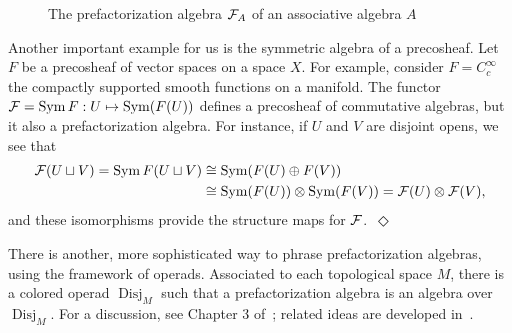 \documentclass[11pt]{amsart}
\def\Disj{\operatorname{Disj}}
\begin{document}
\begin{figure}
\begin{center}
\end{center}
\caption{The prefactorization algebra $\mathcal F_A$ of an associative algebra $A$}
\label{fig:assasfact}
\end{figure}

\begin{eg}\label{ex:SymOfCosheaf}
Another important example for us is the symmetric algebra of a precosheaf. 
Let $F$ be a precosheaf of vector spaces on a space $X$. 
For example, consider $F = C^\infty_c$ the compactly supported smooth functions on a manifold. The functor $\mathcal F  = \operatorname{Sym} F: U \mapsto \operatorname{Sym}(F(U))$ defines a precosheaf of commutative algebras, but it also a prefactorization algebra. For instance, if $U$ and $V$ are disjoint opens, we see that
\begin{align*}
\mathcal F(U \sqcup V) = \operatorname{Sym} F(U \sqcup V) & \cong \operatorname{Sym} (F(U) \oplus F(V)) \\ & \cong \operatorname{Sym}(F(U)) \otimes \operatorname{Sym}(F(V)) = \mathcal F(U) \otimes \mathcal F(V),
\end{align*}
and these isomorphisms provide the structure maps for $\mathcal F$.~\hfill$\Diamond$
\end{eg}

There is another, more sophisticated way to phrase prefactorization algebras, using the framework of operads.
Associated to each topological space $M$, there is a colored operad $\Disj_M$ such that a prefactorization algebra is an algebra over~$\Disj_M$.
For a discussion, see Chapter 3 of~\cite{CG1};
related ideas are developed in~\cite{AF, LurieHA, Ginot}.
\end{document}
